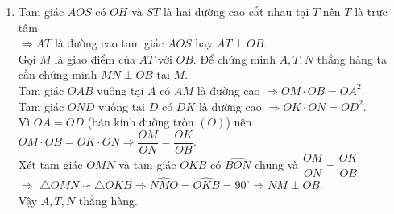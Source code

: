 \begin{bt}
{\begin{enumerate}
			$ \widehat{ACD} =  \widehat{CDO}$ (tam giác $OAD$ cân).\\
			Suy ra $\widehat{EDA}  =  \widehat{CDO}$.	\\
		Mặt khác $ \widehat{CDO} +  \widehat{DAO} = 90^\circ \Rightarrow  \widehat{EDO} = \widehat{ADO} +  \widehat{ADO} =  \widehat{ADO}  + \widehat{EDA}  =  90^\circ$. \\
		Vậy $DE$ là tiếp tuyến của đường tròn $(O)$.
		\item Tam giác $AOS$ có $OH$ và $ST$ là hai đường cao cắt nhau tại $T$ nên $T$ là trực tâm\\  $\Rightarrow  AT$ là đường cao tam giác $AOS$ hay $AT \perp OB$.\\
		Gọi $M$ là giao điểm của $AT$ với $OB$. Để chứng minh $A,T,N$ thẳng hàng ta cần chứng minh $MN \perp OB $ tại $M$. \\
		Tam giác $OAB$ vuông tại $A$ có $AM$ là đường cao $\Rightarrow OM\cdot OB = OA^2$.\\
		Tam giác $OND$ vuông tại $D$ có $DK$ là đường cao $\Rightarrow OK\cdot ON = OD^2$.\\
		Vì $OA=OD$ (bán kính đường tròn $(O)$) nên $OM\cdot OB=OK\cdot ON \Rightarrow \dfrac{OM}{ON}=\dfrac{OK}{OB}.$\\
		Xét tam giác $OMN$ và tam giác $OKB$ có $\widehat{BON}$ chung và $\dfrac{OM}{ON}=\dfrac{OK}{OB}$\\
		$ \Rightarrow$  $\triangle OMN \backsim \triangle OKB \Rightarrow \widehat{NMO} =  \widehat{OKB} = 90^\circ \Rightarrow NM \perp OB$.\\
		 Vậy $A, T, N$ thẳng hàng. 
	\end{enumerate}	
	}
\end{bt}


